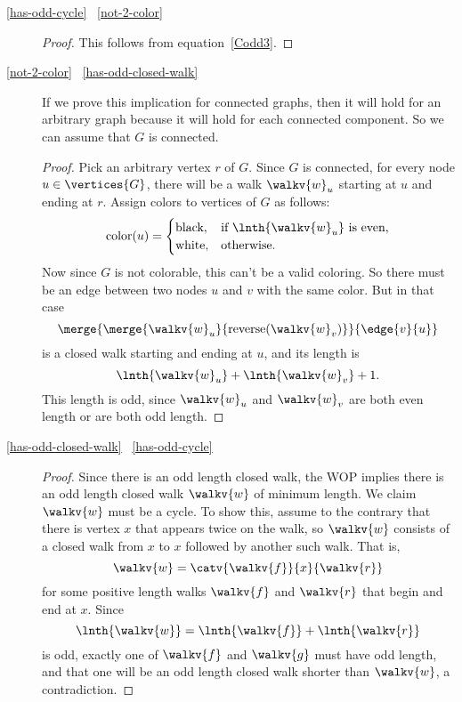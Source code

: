 \begin{description}

\item[\ref{has-odd-cycle} \QIMPLIES\ \ref{not-2-color}]
\begin{proof}
This follows from equation~\ref{Codd3}.
\end{proof}

\item[\ref{not-2-color} \QIMPLIES\ \ref{has-odd-closed-walk}]

  If we prove this implication for connected graphs, then it will hold
  for an arbitrary graph because it will hold for each
  connected component.  So we can assume that $G$ is connected.
\begin{proof}

  Pick an arbitrary vertex $r$ of $G$.  Since $G$ is connected, for every
  node $u \in \vertices{G}$, there will be a walk $\walkv{w}_u$ starting
  at $u$ and ending at $r$.  Assign colors to vertices of $G$ as follows:
\[
\text{color}(u) = \begin{cases}
                   \text{black}, & \text{if $\lnth{\walkv{w}_u}$ is even},\\
                   \text{white}, & \text{otherwise}.
\end{cases}
\]
Now since $G$ is not colorable, this can't be a valid coloring.  So there
must be an edge between two nodes $u$ and $v$ with the same color.  But in
that case
\[
\merge{\merge{\walkv{w}_u}{\text{reverse}(\walkv{w}_v)}}{\edge{v}{u}}
\]
is a closed walk starting and ending at $u$, and its length is
\[
\lnth{\walkv{w}_u} + \lnth{\walkv{w}_v} + 1.
\]
This length is odd, since $\walkv{w}_u$ and $\walkv{w}_v$ are both even
length or are both odd length.
\end{proof}

\item[\ref{has-odd-closed-walk} \QIMPLIES\ \ref{has-odd-cycle}]

\begin{proof}
  Since there is an odd length closed walk, the WOP implies there is an odd
  length closed walk $\walkv{w}$ of minimum length.  We claim $\walkv{w}$
  must be a cycle.  To show this, assume to the contrary that there is
  vertex $x$ that appears twice on the walk, so $\walkv{w}$ consists of a
  closed walk from $x$ to $x$ followed by another such walk.  That is,
\[
\walkv{w} = \catv{\walkv{f}}{x}{\walkv{r}}
\]
for some positive length walks $\walkv{f}$ and $\walkv{r}$ that begin and
end at $x$.  Since
\[
\lnth{\walkv{w}} =  \lnth{\walkv{f}}+ \lnth{\walkv{r}}
\]
is odd, exactly one of $\walkv{f}$ and $\walkv{g}$ must have odd length,
and that one will be an odd length closed walk shorter than $\walkv{w}$, a
contradiction.

\end{proof}
\end{description}

